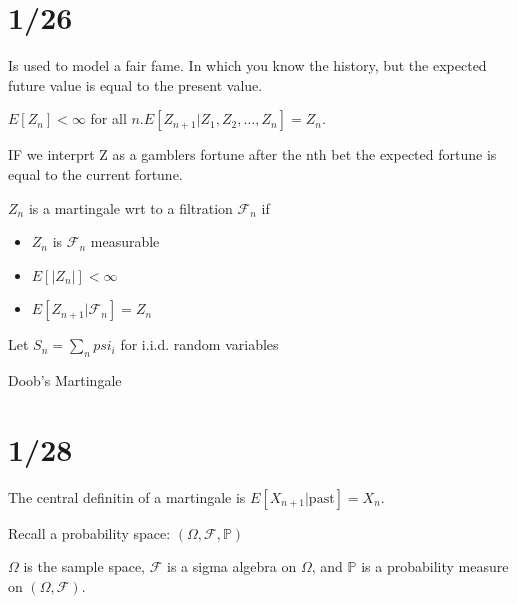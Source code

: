\documentclass[answers,12pt,addpoints]{exam}
\begin{document}
\section{1/26}
\begin{definition}[Martingale]
    Is used to model a fair fame. In which you know the history, but the expected future value is equal to the present value.

    $E[Z_n] < \infty$ for all $n$.$E[Z_{n+1} | Z_1, Z_2, \ldots, Z_n] = Z_n$.
\end{definition}
\begin{remark}
    IF we interprt Z as a gamblers fortune after the nth bet the expected fortune is equal to the current fortune.
\end{remark}
\begin{definition}
    ${Z_n}$ is a martingale wrt to a filtration ${\mathcal{F}_n}$ if
    \begin{itemize}
        \item $Z_n$ is $\mathcal{F}_n$ measurable
        \item $E[|Z_n|] < \infty$
        \item $E[Z_{n+1} | \mathcal{F}_n] = Z_n$
    \end{itemize}
\end{definition}
\begin{example}
    Let $S_n = \sum_n psi_i$ for i.i.d. random variables 
\end{example}
\begin{example}
    
\end{example}
\begin{example}
    
\end{example}
\begin{example}
    Doob's Martingale
\end{example}

\section{1/28}
\begin{remark}
    The central definitin of a martingale is $E[X_{n+1} | \text{past}] = X_n$.

    Recall a probability space: $(\Omega, \mathcal{F}, \mathbb{P})$ 
    
    $\Omega$ is the sample space, $\mathcal{F}$ is a sigma algebra on $\Omega$, and $\mathbb{P}$ is a probability measure on $(\Omega, \mathcal{F})$.
\end{remark}
\end{document}

